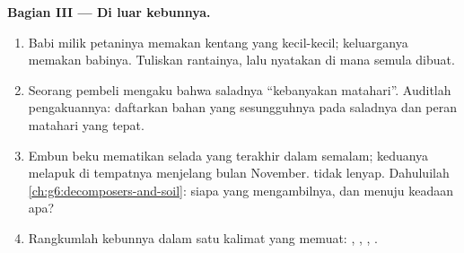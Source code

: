 \begin{problem}
\medskip\noindent\textbf{Bagian III --- Di luar kebunnya.}
\begin{enumerate}[resume]
  \item Babi milik petaninya memakan kentang yang kecil-kecil;
        keluarganya memakan babinya. Tuliskan rantainya, lalu nyatakan
        di mana  semula dibuat.
  \item Seorang pembeli mengaku bahwa saladnya ``kebanyakan matahari''.
        Auditlah pengakuannya: daftarkan bahan yang sesungguhnya pada
         saladnya dan peran matahari yang tepat.
  \item Embun beku mematikan selada yang terakhir dalam semalam;
        keduanya melapuk di tempatnya menjelang bulan November.  tidak lenyap. Dahuluilah
        \cref{ch:g6:decomposers-and-soil}: siapa yang mengambilnya,
        dan menuju keadaan apa?
  \item Rangkumlah kebunnya dalam satu kalimat yang memuat: ,
        , , .
\end{enumerate}
\end{problem}
